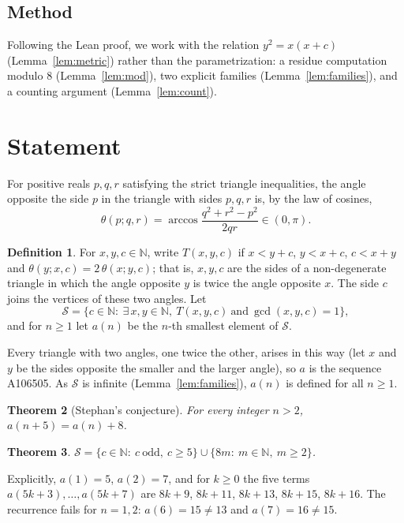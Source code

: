 \documentclass[11pt]{amsart}
\theoremstyle{plain}
\newtheorem{theorem}{Theorem}
\theoremstyle{definition}
\newtheorem{definition}[theorem]{Definition}
\newcommand{\N}{\mathbb{N}}
\newcommand{\Side}{\mathcal{S}}
\newcommand{\ang}{\theta}
\begin{document}
\subsection*{Method}
Following the Lean proof, we work with the relation $y^2=x(x+c)$ (Lemma~\ref{lem:metric}) rather than the parametrization: a residue computation modulo $8$ (Lemma~\ref{lem:mod}), two explicit families (Lemma~\ref{lem:families}), and a counting argument (Lemma~\ref{lem:count}).

\section{Statement}\label{sec:statement}

For positive reals $p,q,r$ satisfying the strict triangle inequalities, the angle opposite the side $p$ in the triangle with sides $p,q,r$ is, by the law of cosines,
\[
  \ang(p;q,r)=\arccos\frac{q^2+r^2-p^2}{2qr}\in(0,\pi).
\]

\begin{definition}\label{def:side}
For $x,y,c\in\N$, write $T(x,y,c)$ if $x<y+c$, $y<x+c$, $c<x+y$ and $\ang(y;x,c)=2\,\ang(x;y,c)$; that is, $x,y,c$ are the sides of a non-degenerate triangle in which the angle opposite $y$ is twice the angle opposite $x$. The side $c$ joins the vertices of these two angles. Let
\[
  \Side=\{c\in\N:\ \exists\, x,y\in\N,\ T(x,y,c)\ \text{and}\ \gcd(x,y,c)=1\},
\]
and for $n\ge1$ let $a(n)$ be the $n$-th smallest element of $\Side$.
\end{definition}

Every triangle with two angles, one twice the other, arises in this way (let $x$ and $y$ be the sides opposite the smaller and the larger angle), so $a$ is the sequence A106505. As $\Side$ is infinite (Lemma~\ref{lem:families}), $a(n)$ is defined for all $n\ge1$.

\begin{theorem}[Stephan's conjecture]\label{thm:main}
For every integer $n>2$, $a(n+5)=a(n)+8$.
\end{theorem}

\begin{theorem}\label{thm:set}
$\Side=\{c\in\N:\ c\ \text{odd},\ c\ge5\}\cup\{8m:\ m\in\N,\ m\ge2\}$.
\end{theorem}

Explicitly, $a(1)=5$, $a(2)=7$, and for $k\ge0$ the five terms $a(5k+3),\dots,a(5k+7)$ are $8k+9$, $8k+11$, $8k+13$, $8k+15$, $8k+16$. The recurrence fails for $n=1,2$: $a(6)=15\ne13$ and $a(7)=16\ne15$.
\end{document}
